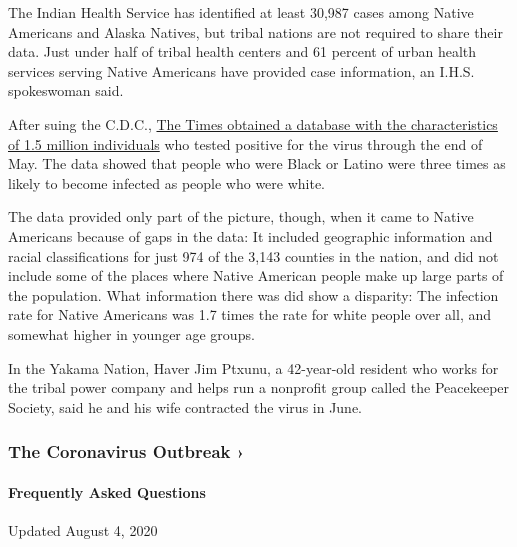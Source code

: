 The Indian Health Service has identified at least 30,987 cases among
Native Americans and Alaska Natives, but tribal nations are not required
to share their data. Just under half of tribal health centers and 61
percent of urban health services serving Native Americans have provided
case information, an I.H.S. spokeswoman said.

After suing the C.D.C.,
\href{https://www.nytimes3xbfgragh.onion/interactive/2020/07/05/us/coronavirus-latinos-african-americans-cdc-data.html}{The
Times obtained a database with the characteristics of 1.5 million
individuals} who tested positive for the virus through the end of May.
The data showed that people who were Black or Latino were three times as
likely to become infected as people who were white.

The data provided only part of the picture, though, when it came to
Native Americans because of gaps in the data: It included geographic
information and racial classifications for just 974 of the 3,143
counties in the nation, and did not include some of the places where
Native American people make up large parts of the population. What
information there was did show a disparity: The infection rate for
Native Americans was 1.7 times the rate for white people over all, and
somewhat higher in younger age groups.

In the Yakama Nation, Haver Jim Ptxunu, a 42-year-old resident who works
for the tribal power company and helps run a nonprofit group called the
Peacekeeper Society, said he and his wife contracted the virus in June.

\href{https://www.nytimes3xbfgragh.onion/news-event/coronavirus?action=click\&pgtype=Article\&state=default\&region=MAIN_CONTENT_3\&context=storylines_faq}{}

\hypertarget{the-coronavirus-outbreak-}{%
\subsubsection{The Coronavirus Outbreak
›}\label{the-coronavirus-outbreak-}}

\hypertarget{frequently-asked-questions}{%
\paragraph{Frequently Asked
Questions}\label{frequently-asked-questions}}

Updated August 4, 2020

